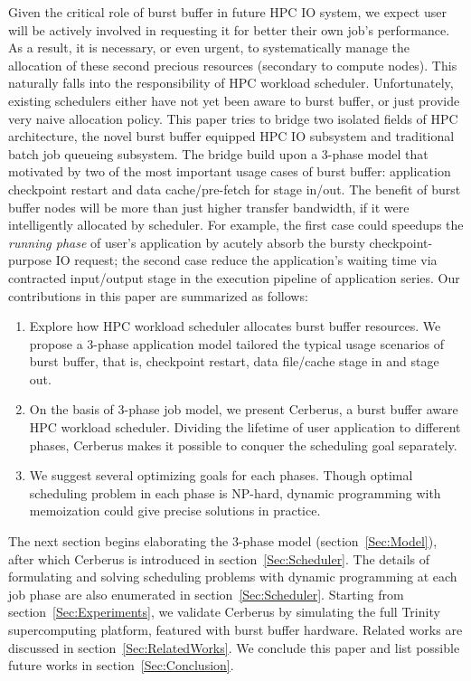 Given the critical role of burst buffer in future HPC IO system,
we expect user will be actively involved in requesting it for
better their own job's performance.
As a result, it is necessary, or even urgent, to systematically manage
the allocation of these second precious resources (secondary to compute nodes).
This naturally falls into the responsibility of HPC workload scheduler.
Unfortunately, existing schedulers
either have not yet been aware to burst buffer\cite{Moab, other scheduler citation needed},
or just provide very naive allocation policy\cite{SlurmBBGuide}.
This paper tries to bridge two isolated fields of HPC architecture,
the novel burst buffer equipped HPC IO subsystem and
traditional batch job queueing subsystem.
The bridge build upon a 3-phase model that motivated by two of the most
important usage cases of burst buffer:
application checkpoint restart and data cache/pre-fetch for stage in/out.
The benefit of burst buffer nodes will be more than just higher transfer
bandwidth, if it were intelligently allocated by scheduler.
For example, the first case could speedups the \textit{running phase} of
user's application by acutely absorb the bursty checkpoint-purpose IO request;
the second case reduce the application's waiting time via
contracted input/output stage in the execution pipeline of application series.
Our contributions in this paper are summarized as follows:
\begin{enumerate}
        \item Explore how HPC workload scheduler allocates burst buffer resources.
                We propose a 3-phase application model tailored the typical
                usage scenarios of burst buffer, that is, checkpoint restart,
                data file/cache stage in and stage out.
        \item On the basis of 3-phase job model, we present Cerberus,
                a burst buffer aware HPC workload scheduler.
                Dividing the lifetime of user application to different phases,
                Cerberus makes it possible to conquer the scheduling goal separately.
        \item We suggest several optimizing goals for each phases.
                Though optimal scheduling problem in each phase is NP-hard,
                dynamic programming with memoization could give precise solutions
                in practice.
\end{enumerate}

The next section begins elaborating the 3-phase model (section~\ref{Sec:Model}),
after which Cerberus is introduced in section~\ref{Sec:Scheduler}.
The details of formulating and solving scheduling problems with
dynamic programming at each job phase are also
enumerated in section~\ref{Sec:Scheduler}.
Starting from section~\ref{Sec:Experiments}, we validate Cerberus
by simulating the full Trinity supercomputing platform, featured with
burst buffer hardware.
Related works are discussed in section~\ref{Sec:RelatedWorks}.
We conclude this paper and list possible future works in section~\ref{Sec:Conclusion}.





